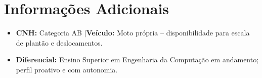 \documentclass[10pt,a4paper]{article}
\begin{document}
\section{Informações Adicionais}
\begin{itemize}
  \item \textbf{CNH:} Categoria AB \quad$\vert$\quad \textbf{Veículo:} Moto própria -- disponibilidade para escala de plantão e deslocamentos.
  \item \textbf{Diferencial:} Ensino Superior em Engenharia da Computação em andamento; perfil proativo e com autonomia.
\end{itemize}
\end{document}
